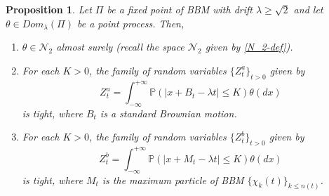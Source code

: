 \documentclass[a4paper,reqno]{amsart}%
\newcommand{\1}{\mathbf 1}
\theoremstyle{mine}
\numberwithin{theorem}{section}
\newtheorem{proposition}[theorem]{Proposition}
\numberwithin{equation}{section}
\theoremstyle{remark}
\begin{document}
\begin{proposition}\label{crucial-tightness-prop}
    Let $\Pi$ be a fixed point of BBM with drift $\lambda \geq \sqrt{2}$ and let $\theta \in Dom_{\lambda}(\Pi)$ be a point process. Then, 
    \begin{enumerate}
        \item $\theta \in \mathcal{N}_2$ almost surely (recall the space $\mathcal{N}_2$ given by \eqref{N_2-def}). 

        \item For each $K>0$, the family of random variables $\{Z_t^a\}_{t > 0}$ given by \[ Z_t^a = \int_{-\infty}^{+\infty} \mathbb{P}(|x + B_t - \lambda t| \leq K) \theta(dx)\] is tight, where $B_t$ is a standard Brownian motion.  

        \item For each $K>0$, the family of random variables $\{Z_t^b\}_{t > 0}$ given by \[ Z_t^b = \int_{-\infty}^{+\infty} \mathbb{P}(|x + M_t - \lambda t| \leq K) \theta(dx)\] is tight, where $M_t$ is the maximum particle of BBM $\{\chi_k(t)\}_{k\leq n(t)}$. 
    \end{enumerate}
\end{proposition}
\end{document}
